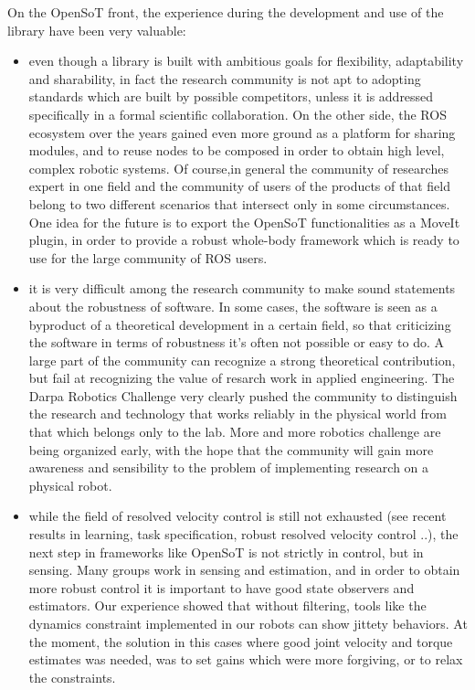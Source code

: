 \documentclass[%
	paper=A4,					%
	twoside=true,				%
	openright,			.
	parskip=full,				%
	chapterprefix=true,			%
	11pt,						%
	headings=normal,			%
	bibliography=totoc,			%
	listof=totoc,				%
	titlepage=on,				%
	captions=tableabove,		%
	draft=true,				%
]{scrreprt}%
\begin{document}
On the OpenSoT front, the experience during the development and use of the library have been very valuable:
\begin{itemize}
 \item even though a library is built with ambitious goals for flexibility, adaptability and sharability, in fact the research community is not apt to adopting standards which are built by possible competitors, unless it is addressed specifically in a formal scientific collaboration. On the other side, the ROS ecosystem over the years gained even more ground as a platform for sharing modules, and to reuse nodes to be composed in order to obtain high level, complex robotic systems. Of course,in general the community of researches expert in one field and the community of users of the products of that field belong to two different scenarios that intersect only in some circumstances. One idea for the future is to export the OpenSoT functionalities as a MoveIt plugin, in order to provide a robust whole-body framework which is ready to use for the large community of ROS users.
 \item it is very difficult among the research community to make sound statements about the robustness of software. In some cases, the software is seen as a byproduct of a theoretical development in a certain field, so that criticizing the software in terms of robustness it's often not possible or easy to do. A large part of the community can recognize a strong theoretical contribution, but fail at recognizing the value of resarch work in applied engineering. The Darpa Robotics Challenge very clearly pushed the community to distinguish the research and technology that works reliably in the physical world from that which belongs only to the lab. More and more robotics challenge are being organized early, with the hope that the community will gain more awareness and sensibility to the problem of implementing research on a physical robot.
 \item while the field of resolved velocity control is still not exhausted (see recent results in learning, task specification, robust resolved velocity  control ..), the next step in frameworks like OpenSoT is not strictly in control, but in sensing. Many groups work in sensing and estimation, and in order to obtain more robust control it is important to have good state observers and estimators. Our experience showed that without filtering, tools like the dynamics constraint implemented in our robots can show jittety behaviors. At the moment, the solution in this cases where good joint velocity and torque estimates was needed, was to set gains which were more forgiving, or to relax the constraints.

\end{itemize}
\end{document}
